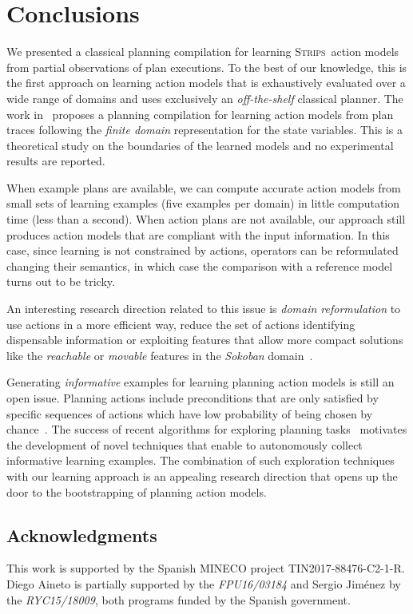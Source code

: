 \documentclass[runningheads]{llncs}
\newcommand{\strips}{\textsc{Strips}}     %
\begin{document}
\section{Conclusions}
We presented a classical planning compilation for learning \strips\ action models from partial observations of plan executions. To the best of our knowledge, this is the first approach on learning action models that is exhaustively evaluated over a wide range of domains and uses exclusively an {\em off-the-shelf} classical planner. The work in~\cite{SternJ17} proposes a planning compilation for learning action models from plan traces following the {\em finite domain} representation for the state variables. This is a theoretical study on the boundaries of the learned models and no experimental results are reported.

When example plans are available, we can compute accurate action models from small sets of learning examples (five examples per domain) in little computation time (less than a second). When action plans are not available, our approach still produces action models that are compliant with the input information. In this case, since learning is not constrained by actions, operators can be reformulated changing their semantics, in which case the comparison with a reference model turns out to be tricky.

An interesting research direction related to this issue is {\em domain reformulation} to use actions in a more efficient way, reduce the set of actions identifying dispensable information or exploiting features that allow more compact solutions like the {\em reachable} or {\em movable} features in the {\em Sokoban} domain~\cite{haslum:axiomsoptimal:ijcai15}.

Generating {\em informative} examples for learning planning action models is still an open issue. Planning actions include preconditions that are only satisfied by specific sequences of actions which have low probability of being chosen by chance~\cite{fern2004learning}. The success of recent algorithms for exploring planning tasks~\cite{FrancesRLG17} motivates the development of novel techniques that enable to autonomously collect informative learning examples. The combination of such exploration techniques with our learning approach is an appealing research direction that opens up the door to the bootstrapping of planning action models.


\subsection*{Acknowledgments}
This work is supported by the Spanish MINECO project TIN2017-88476-C2-1-R. Diego Aineto is partially supported by the {\it FPU16/03184} and Sergio Jim\'enez by the {\it RYC15/18009}, both programs funded by the Spanish government.



\end{document}
